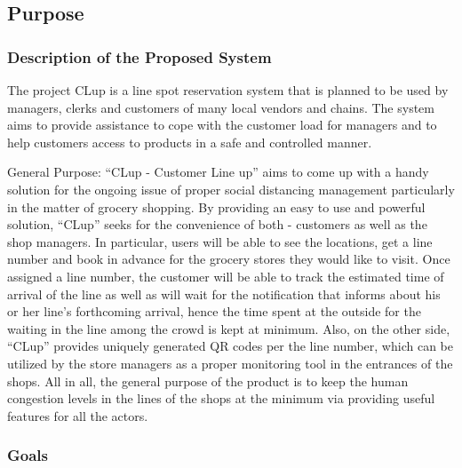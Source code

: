 \subsection{Purpose}

\subsubsection{Description of the Proposed System}
The project CLup is a line spot reservation system that is planned to be used by managers, clerks and customers of many local vendors and chains.
The system aims to provide assistance to cope with the customer load for managers and to help customers access to products in a safe and controlled manner.

General Purpose:
“CLup - Customer Line up” aims to come up with a handy solution for the ongoing issue of proper social distancing management particularly in the matter of grocery shopping. By providing an easy to use and powerful solution, “CLup” seeks for the convenience of both - customers as well as the shop managers. In particular, users will be able to see the locations, get a line number and book in advance for the grocery stores they would like to visit. Once assigned a line number, the customer will be able to track the estimated time of arrival of the line as well as will wait for the notification that informs about his or her line’s forthcoming arrival, hence the time spent at the outside for the waiting in the line among the crowd is kept at minimum. Also, on the other side, “CLup” provides uniquely generated QR codes per the line number, which can be utilized by the store managers as a proper monitoring tool in the entrances of the shops. All in all, the general purpose of the product is to keep the human congestion levels in the lines of the shops at the minimum via providing useful features for all the actors.




\subsubsection{Goals}


